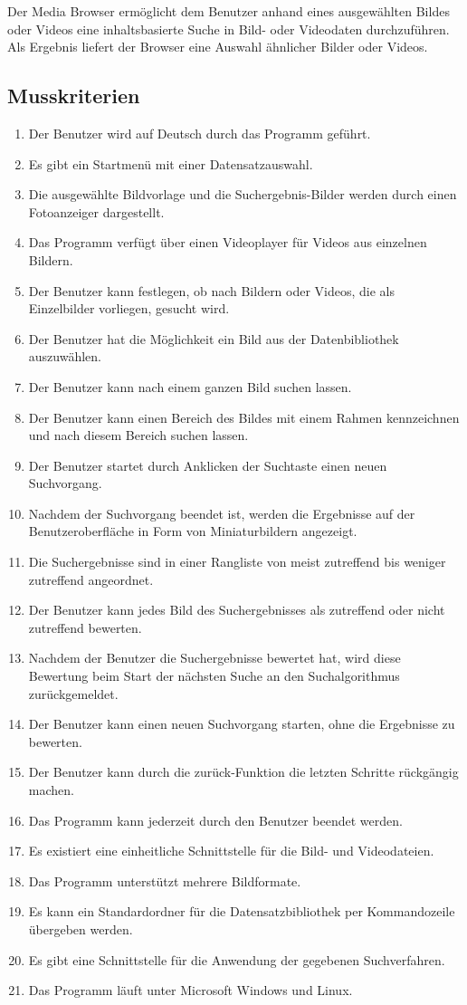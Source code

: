 Der Media Browser ermöglicht dem Benutzer anhand eines ausgewählten Bildes oder Videos eine inhaltsbasierte Suche in Bild- oder Videodaten durchzuführen. Als Ergebnis liefert der Browser eine Auswahl ähnlicher Bilder oder Videos.
\subsection{Musskriterien}
\begin{enumerate} [label=\bfseries /MK \arabic*0/]
\item Der Benutzer wird auf Deutsch durch das Programm geführt.
\item Es gibt ein Startmenü mit einer Datensatzauswahl.
\item Die ausgewählte Bildvorlage und die Suchergebnis-Bilder werden durch einen Fotoanzeiger dargestellt.
\item Das Programm verfügt über einen Videoplayer für Videos aus einzelnen Bildern.
\item Der Benutzer kann festlegen, ob nach Bildern oder Videos, die als Einzelbilder vorliegen, gesucht wird.
\item Der Benutzer hat die Möglichkeit ein Bild aus der Datenbibliothek auszuwählen.
\item Der Benutzer kann nach einem ganzen Bild suchen lassen.
\item Der Benutzer kann einen Bereich des Bildes mit einem Rahmen kennzeichnen und nach diesem Bereich suchen lassen.
\item Der Benutzer startet durch Anklicken der Suchtaste einen neuen Suchvorgang.
\item Nachdem der Suchvorgang beendet ist, werden die Ergebnisse auf der Benutzeroberfläche in Form von Miniaturbildern angezeigt.
\item Die Suchergebnisse sind in einer Rangliste von meist zutreffend bis weniger zutreffend angeordnet.
\item Der Benutzer kann jedes Bild des Suchergebnisses als zutreffend oder nicht zutreffend bewerten.
\item Nachdem der Benutzer die Suchergebnisse bewertet hat, wird diese Bewertung beim Start der nächsten Suche an den Suchalgorithmus zurückgemeldet.
\item Der Benutzer kann einen neuen Suchvorgang starten, ohne die Ergebnisse zu bewerten.
\item Der Benutzer kann durch die zurück-Funktion die letzten Schritte rückgängig machen.
\item Das Programm kann jederzeit durch den Benutzer beendet werden.
\item Es existiert eine einheitliche Schnittstelle für die Bild- und Videodateien.
\item Das Programm unterstützt mehrere Bildformate.
\item Es kann ein Standardordner für die Datensatzbibliothek per Kommandozeile übergeben werden.
\item Es gibt eine Schnittstelle für die Anwendung der gegebenen Suchverfahren.
\item Das Programm läuft unter Microsoft Windows und Linux.
\end{enumerate}
